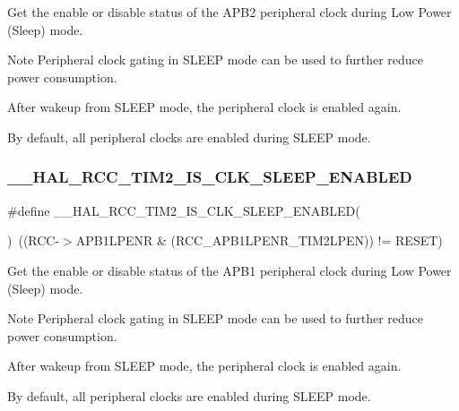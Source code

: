 Get the enable or disable status of the A\+P\+B2 peripheral clock during Low Power (Sleep) mode. 

\begin{DoxyNote}{Note}
Peripheral clock gating in S\+L\+E\+EP mode can be used to further reduce power consumption. 

After wakeup from S\+L\+E\+EP mode, the peripheral clock is enabled again. 

By default, all peripheral clocks are enabled during S\+L\+E\+EP mode. 
\end{DoxyNote}
\mbox{\label{group___r_c_c___clock___sleep___enable___disable___status_gaf38181befdeecf6a61c03885d3645bf1}} 
\subsubsection{\texorpdfstring{\_\_HAL\_RCC\_TIM2\_IS\_CLK\_SLEEP\_ENABLED}{\_\_HAL\_RCC\_TIM2\_IS\_CLK\_SLEEP\_ENABLED}}
{\footnotesize\ttfamily \#define \+\_\+\+\_\+\+H\+A\+L\+\_\+\+R\+C\+C\+\_\+\+T\+I\+M2\+\_\+\+I\+S\+\_\+\+C\+L\+K\+\_\+\+S\+L\+E\+E\+P\+\_\+\+E\+N\+A\+B\+L\+ED(\begin{DoxyParamCaption}{ }\end{DoxyParamCaption})~((R\+CC-\/$>$A\+P\+B1\+L\+P\+E\+NR \& (R\+C\+C\+\_\+\+A\+P\+B1\+L\+P\+E\+N\+R\+\_\+\+T\+I\+M2\+L\+P\+EN)) != R\+E\+S\+ET)}



Get the enable or disable status of the A\+P\+B1 peripheral clock during Low Power (Sleep) mode. 

\begin{DoxyNote}{Note}
Peripheral clock gating in S\+L\+E\+EP mode can be used to further reduce power consumption. 

After wakeup from S\+L\+E\+EP mode, the peripheral clock is enabled again. 

By default, all peripheral clocks are enabled during S\+L\+E\+EP mode. 
\end{DoxyNote}

